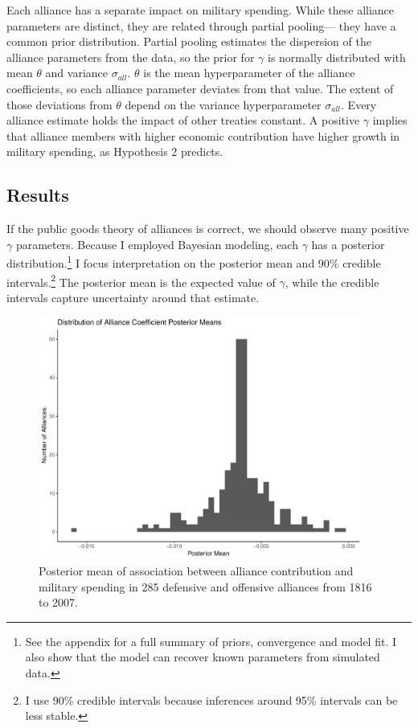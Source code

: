 \documentclass[12pt]{article}
\begin{document}
Each alliance has a separate impact on military spending.
While these alliance parameters are distinct, they are related through partial pooling--- they have a common prior distribution.
Partial pooling estimates the dispersion of the alliance parameters from the data, so the prior for $\gamma$ is normally distributed with mean $\theta$ and variance $\sigma_{all}$. 
$\theta$ is the mean hyperparameter of the alliance coefficients, so each alliance parameter deviates from that value.
The extent of those deviations from $\theta$ depend on the variance hyperparameter $\sigma_{all}$.
Every alliance estimate holds the impact of other treaties constant. 
A positive $\gamma$ implies that alliance members with higher economic contribution have higher growth in military spending, as Hypothesis 2 predicts. 
    


\subsection{Results} 


If the public goods theory of alliances is correct, we should observe many positive $\gamma$ parameters. 
Because I employed Bayesian modeling, each $\gamma$ has a posterior distribution.\footnote{See the appendix for a full summary of priors, convergence and model fit. I also show that the model can recover known parameters from simulated data.} 
I focus interpretation on the posterior mean and 90\% credible intervals.\footnote{I use 90\% credible intervals because inferences around 95\% intervals can be less stable.}
The posterior mean is the expected value of $\gamma$, while the credible intervals capture uncertainty around that estimate.  


\begin{figure}[htbp]
	\centering
		\includegraphics[width=0.95\textwidth]{alliance-coefs-hist.pdf}
	\caption{Posterior mean of association between alliance contribution and military spending in 285 defensive and offensive alliances from 1816 to 2007.}
	\label{fig:alliance-coefs-hist}
\end{figure}
\end{document}
